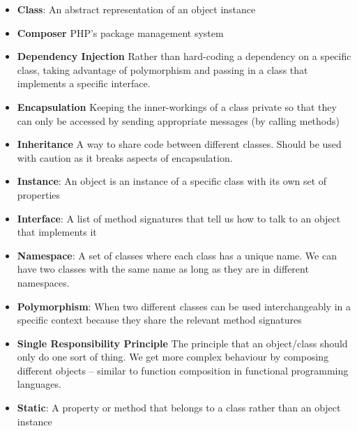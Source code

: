 \begin{itemize}[leftmargin=*]
    \item
        \textbf{Class}:
        An abstract representation of an object instance
    \item
        \textbf{Composer}
        PHP's package management system
    \item
        \textbf{Dependency Injection}
        Rather than hard-coding a dependency on a specific class, taking advantage of polymorphism and passing in a class that implements a specific interface.
    \item
        \textbf{Encapsulation}
        Keeping the inner-workings of a class private so that they can only be accessed by sending appropriate messages (by calling methods)
    \item
        \textbf{Inheritance}
        A way to share code between different classes. Should be used with caution as it breaks aspects of encapsulation.
    \item
        \textbf{Instance}:
        An object is an instance of a specific class with its own set of properties
    \item
        \textbf{Interface}:
        A list of method signatures that tell us how to talk to an object that implements it
    \item
        \textbf{Namespace}:
        A set of classes where each class has a unique name. We can have two classes with the same name as long as they are in different namespaces.
    \item
        \textbf{Polymorphism}:
        When two different classes can be used interchangeably in a specific context because they share the relevant method signatures
    \item
        \textbf{Single Responsibility Principle}
        The principle that an object/class should only do one sort of thing. We get more complex behaviour by composing different objects – similar to function composition in functional programming languages.
    \item
        \textbf{Static}:
        A property or method that belongs to a class rather than an object instance
\end{itemize}
